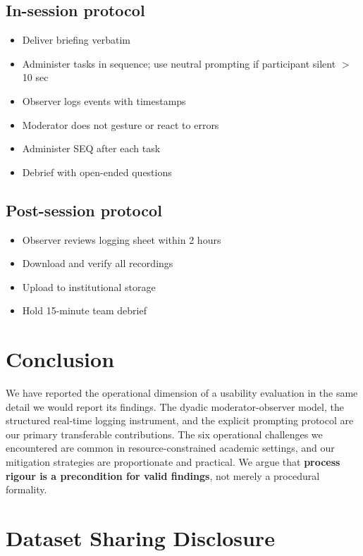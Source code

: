 \documentclass[conference]{IEEEtran}
\begin{document}
\subsection{In-session protocol}
\begin{itemize}
  \item Deliver briefing verbatim
  \item Administer tasks in sequence; use neutral prompting if participant silent $>$10 sec
  \item Observer logs events with timestamps
  \item Moderator does not gesture or react to errors
  \item Administer SEQ after each task
  \item Debrief with open-ended questions
\end{itemize}

\subsection{Post-session protocol}
\begin{itemize}
  \item Observer reviews logging sheet within 2 hours
  \item Download and verify all recordings
  \item Upload to institutional storage
  \item Hold 15-minute team debrief
\end{itemize}

\section{Conclusion}

We have reported the operational dimension of a usability evaluation in the same detail we would report
its findings. The dyadic moderator-observer model, the structured real-time logging instrument, and
the explicit prompting protocol are our primary transferable contributions. The six operational
challenges we encountered are common in resource-constrained academic settings, and our mitigation
strategies are proportionate and practical. We argue that \textbf{process rigour is a precondition for
valid findings}, not merely a procedural formality.

\section*{Dataset Sharing Disclosure}
\end{document}

